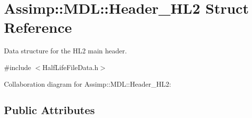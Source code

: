 \hypertarget{struct_assimp_1_1_m_d_l_1_1_header___h_l2}{\section{Assimp\+:\+:M\+D\+L\+:\+:Header\+\_\+\+H\+L2 Struct Reference}
\label{struct_assimp_1_1_m_d_l_1_1_header___h_l2}
}


Data structure for the H\+L2 main header.  




{\ttfamily \#include $<$Half\+Life\+File\+Data.\+h$>$}



Collaboration diagram for Assimp\+:\+:M\+D\+L\+:\+:Header\+\_\+\+H\+L2\+:
\subsection*{Public Attributes}
